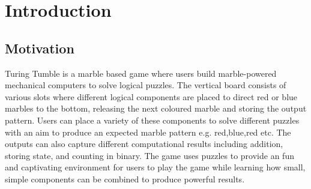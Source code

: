 \documentclass{l4proj}
\begin{document}
%
%
%
%
%
%
%
%
\chapter{Introduction}


\section{Motivation}
Turing Tumble is a marble based game where users build marble-powered mechanical computers to solve logical puzzles. The vertical board consists of various slots where different logical components are placed to direct red or blue marbles to the bottom, releasing the next coloured marble and storing the output pattern. Users can place a variety of these components to solve different puzzles with an aim to produce an expected marble pattern e.g. red,blue,red etc. The outputs can also capture different computational results including addition, storing state, and counting in binary. The game uses puzzles to provide an fun and captivating environment for users to play the game while learning how small, simple components can be combined to produce powerful results. 
\end{document}
